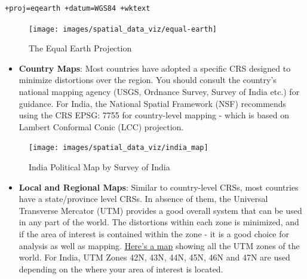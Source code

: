 \documentclass[
  12pt,
  a4paper]{article}
\providecommand{\tightlist}{%
  \setlength{\itemsep}{0pt}\setlength{\parskip}{0pt}}
\begin{document}
\begin{verbatim}
+proj=eqearth +datum=WGS84 +wktext
\end{verbatim}

\begin{figure}

{\centering \texttt{[image: images/spatial\_data\_viz/equal-earth]} 

}

\caption{The Equal Earth Projection}\label{fig:unnamed-chunk-2}
\end{figure}

\begin{itemize}
\tightlist
\item
  \textbf{Country Maps}: Most countries have adopted a specific CRS
  designed to minimize distortions over the region. You should consult
  the country's national mapping agency (USGS, Ordnance Survey, Survey
  of India etc.) for guidance. For India, the National Spatial Framework
  (NSF) recommends using the CRS EPSG: 7755 for country-level mapping -
  which is based on Lambert Conformal Conic (LCC) projection.
\end{itemize}

\begin{figure}

{\centering \texttt{[image: images/spatial\_data\_viz/india\_map]} 

}

\caption{India Political Map by Survey of India}\label{fig:unnamed-chunk-3}
\end{figure}

\begin{itemize}
\tightlist
\item
  \textbf{Local and Regional Maps}: Similar to country-level CRSs, most
  countries have a state/province level CRSs. In absence of them, the
  Universal Transverse Mercator (UTM) provides a good overall system
  that can be used in any part of the world. The distortions within each
  zone is minimized, and if the area of interest is contained within the
  zone - it is a good choice for analysis as well as mapping.
  \href{http://www.dmap.co.uk/utmworld.htm}{Here's a map} showing all
  the UTM zones of the world. For India, UTM Zones 42N, 43N, 44N, 45N,
  46N and 47N are used depending on the where your area of interest is
  located.
\end{itemize}
\end{document}
